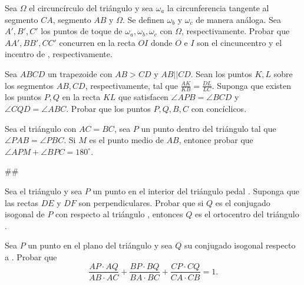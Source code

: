 \begin{section-problem}
    Sea $\Omega$ el circuncírculo del triángulo  y sea $\omega_a$ la circunferencia tangente al segmento $CA$, segmento $AB$ y $\Omega$.
    Se definen $\omega_b$ y $\omega_c$ de manera análoga.
    Sea $A', B', C'$ los puntos de toque de $\omega_a, \omega_b, \omega_c$ con $\Omega$, respectivamente.
    Probar que $AA', BB', CC'$ concurren en la recta $OI$ donde $O$ e $I$ son el cincuncentro y el incentro de , respectivamente.
\end{section-problem}

\begin{section-problem}
    Sea $ABCD$ un trapezoide con $AB > CD$ y $AB || CD$.
    Sean los puntos $K, L$ sobre los segmentos $AB, CD$, respectivamente, tal que $\frac{AK}{KB} = \frac{DL}{LC}$.
    Suponga que existen los puntos $P, Q$ en la recta $KL$ que satisfacen $\angle APB = \angle BCD$ y $\angle CQD = \angle ABC$.
    Probar que los puntos $P, Q, B, C$ con concíclicos.
\end{section-problem}

\begin{section-problem}
    Sea el triángulo  con $AC = BC$, sea $P$ un punto dentro del triángulo tal que $\angle PAB = \angle PBC$.
    Si $M$ es el punto medio de $AB$, entonce probar que $\angle APM + \angle BPC = 180^{\circ}$.
\end{section-problem}

\#\#

\begin{section-problem}
    Sea el triángulo  y sea $P$ un punto en el interior del triángulo pedal .
    Suponga que las rectas $DE$ y $DF$ son perpendiculares.
    Probar que si $Q$ es el conjugado isogonal de $P$ con respecto al triángulo , entonces $Q$ es el ortocentro del triángulo .
\end{section-problem}

\begin{section-problem}
    Sea $P$ un punto en el plano del triángulo  y sea $Q$ su conjugado isogonal respecto a .
    Probar que
    \[
        \frac{AP \cdot AQ}{AB \cdot AC} + \frac{BP \cdot BQ}{BA \cdot BC} + \frac{CP \cdot CQ}{CA \cdot CB} = 1.
    \]
\end{section-problem}

